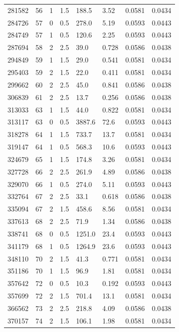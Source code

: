 \documentclass[preview]{standalone}
\begin{document}
{{{\begin{tabular}{L{1.2cm}C{1.2cm} C{0.3cm}C{0.5cm} C{1.4cm}C{1.4cm} C{1.4cm}C{1.4cm}}
  281582  &    56  & 1     & 1.5 &  188.5  & 3.52  & 0.0581 &  0.0434   \\ 
  284726  &    57  & 0     & 0.5 &  278.0  & 5.19  & 0.0593 &  0.0443   \\ 
  284749  &    57  & 1     & 0.5 &  120.6  & 2.25  & 0.0593 &  0.0443   \\ 
  287694  &    58  & 2     & 2.5 &  39.0  & 0.728  & 0.0586 &  0.0438   \\ 
  294849  &    59  & 1     & 1.5 &  29.0  & 0.541  & 0.0581 &  0.0434   \\ 
  295403  &    59  & 2     & 1.5 &  22.0  & 0.411  & 0.0581 &  0.0434   \\ 
  299662  &    60  & 2     & 2.5 &  45.0  & 0.841  & 0.0586 &  0.0438   \\ 
  306839  &    61  & 2     & 2.5 &  13.7  & 0.256  & 0.0586 &  0.0438   \\ 
  313033  &    63  & 1     & 1.5 &  44.0  & 0.822  & 0.0581 &  0.0434   \\ 
  313117  &    63  & 0     & 0.5 &  3887.6  & 72.6  & 0.0593 &  0.0443   \\ 
  318278  &    64  & 1     & 1.5 &  733.7  & 13.7  & 0.0581 &  0.0434   \\ 
  319147  &    64  & 1     & 0.5 &  568.3  & 10.6  & 0.0593 &  0.0443   \\ 
  324679  &    65  & 1     & 1.5 &  174.8  & 3.26  & 0.0581 &  0.0434   \\ 
  327728  &    66  & 2     & 2.5 &  261.9  & 4.89  & 0.0586 &  0.0438   \\ 
  329070  &    66  & 1     & 0.5 &  274.0  & 5.11  & 0.0593 &  0.0443   \\ 
  332764  &    67  & 2     & 2.5 &  33.1  & 0.618  & 0.0586 &  0.0438   \\ 
  335094  &    67  & 2     & 1.5 &  458.6  & 8.56  & 0.0581 &  0.0434   \\ 
  337613  &    68  & 2     & 2.5 &  71.9  & 1.34  & 0.0586 &  0.0438   \\ 
  338741  &    68  & 0     & 0.5 &  1251.0  & 23.4  & 0.0593 &  0.0443   \\ 
  341179  &    68  & 1     & 0.5 &  1264.9  & 23.6  & 0.0593 &  0.0443   \\ 
  348110  &    70  & 2     & 1.5 &  41.3  & 0.771  & 0.0581 &  0.0434   \\ 
  351186  &    70  & 1     & 1.5 &  96.9  & 1.81  & 0.0581 &  0.0434   \\ 
  357642  &    72  & 0     & 0.5 &  10.3  & 0.192  & 0.0593 &  0.0443   \\ 
  357699  &    72  & 2     & 1.5 &  701.4  & 13.1  & 0.0581 &  0.0434   \\ 
  366562  &    73  & 2     & 2.5 &  218.8  & 4.09  & 0.0586 &  0.0438   \\ 
  370157  &    74  & 2     & 1.5 &  106.1  & 1.98  & 0.0581 &  0.0434   \\ 
\hline 
\end{tabular} 

}}}
\end{document}
